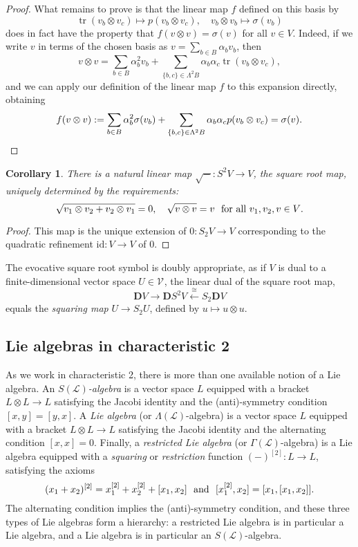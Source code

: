 \documentclass[11pt]{amsart} \renewcommand{\baselinestretch}{1.2}
\theoremstyle{plain}
\newtheorem{cor}[thm]{Corollary}
\theoremstyle{definition}
\DeclareMathOperator{\trace}{tr}
\newcommand{\DASH}{\mathrm{-}}
\renewcommand{\to}{\longrightarrow}
\newcommand{\from}{\longleftarrow}
\newcommand{\scrL}{\mathscr{L}}
\newcommand{\calV}{\mathcal{V}}
\newcommand{\LieOperad}{{\scrL}}
\newcommand{\restn}[1]{#1^{[2]}}
\newcommand{\vect}[2]{\calV^{#1}_{#2}}
\newcommand{\Id}{\mathrm{id}}
\newcommand{\dual}{\mathbf{D}}
\renewcommand{\mapsto}{\longmapsto}
\begin{document}
\begin{Conventions and notation}
\begin{proof}
What remains to prove is that the linear map $f$ defined on this basis by
\[\trace(v_b\otimes v_c)\mapsto p(v_b\otimes v_c),\quad v_b\otimes v_b\mapsto \sigma(v_b)\]
does in fact have the property that $f(v\otimes v)=\sigma(v)$ for \textup{all} $v\in V$. Indeed, if we write $v$ in terms of the chosen basis as $v=\sum_{b\in B}\alpha_bv_b$, then
\[v\otimes v
=
\sum_{b\in B}\alpha_b^2v_b+\sum_{\{b,c\}\in \Lambda^2B}\alpha_b\alpha_c\trace(v_b\otimes v_c),\]
and we can apply our definition of the linear map $f$ to this expansion directly, obtaining
\[f(v\otimes v):=
\sum_{b\in B}\alpha_b^2\sigma(v_b)+\sum_{\{b,c\}\in \Lambda^2B}\alpha_b\alpha_cp(v_b\otimes v_c)=\sigma(v).\qedhere\]
\end{proof}
\begin{cor}
There is a natural linear map $\sqrt{\DASH}:S^2V\to V$, the \emph{square root map}, uniquely determined by the requirements:
\[\sqrt{v_1\otimes v_2+v_2\otimes v_1}=0,\ \ \ \sqrt{v\otimes v}=v \textup{ \ for all $v_1,v_2,v\in V$}.\]
\end{cor}
\begin{proof}
This map is the unique extension of $0:S_2V\to V$ corresponding to the quadratic refinement $\Id:V\to V$ of $0$.
\end{proof}
\noindent The evocative square root symbol is doubly appropriate, as if $V$ is dual to a finite-dimensional vector space $U\in\vect{}{}$, the linear dual of the square root map,
\[\dual V\to \dual S^2V\overset{\cong }{\from}S_2\dual V\]
equals the \emph{squaring map} $U\to S_2U$, defined by $u\mapsto u\otimes u$.


\subsection{Lie algebras in characteristic 2}
\label{introtoLiealgssection}
As we work in characteristic 2, there is more than one available notion of a Lie algebra. An \emph{$S(\LieOperad)$-algebra} is a vector space $L$ equipped with a bracket $L\otimes L\to L$ satisfying the Jacobi identity and the (anti)-symmetry condition $[x,y]=[y,x]$. A \emph{Lie algebra} (or $\Lambda(\LieOperad)$-algebra) is a vector space $L$ equipped with a bracket $L\otimes L\to L$ satisfying the Jacobi identity and the alternating condition $[x,x]=0$. Finally, a \emph{restricted Lie algebra} \cite{CurtisSimplicialHtpy.pdf,6Author.pdf} (or $\Gamma(\LieOperad)$-algebra) is a Lie algebra equipped with a \emph{squaring} or \emph{restriction} function $\restn{(\DASH)}:L\to L$, satisfying the axioms
\[\restn{(x_1+x_2)}=\restn{x_1}+\restn{x_2}+[x_1,x_2]\textup{ \ and \ }[\restn{x_1},x_2]=[x_1,[x_1,x_2]].\]
The alternating condition implies the (anti)-symmetry condition, and these three types of Lie algebras form a hierarchy: a restricted Lie algebra is in particular a Lie algebra, and a Lie algebra is in particular an $S(\LieOperad)$-algebra.


\end{Conventions and notation}
\end{document}

